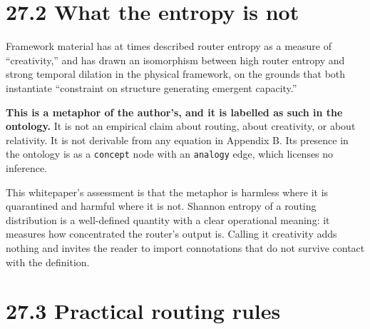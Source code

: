 \documentclass[
  11pt]{report}
\begin{document}
\hypertarget{what-the-entropy-is-not}{%
\section{27.2 What the entropy is not}\label{what-the-entropy-is-not}}

Framework material has at times described router entropy as a measure of
``creativity,'' and has drawn an isomorphism between high router entropy
and strong temporal dilation in the physical framework, on the grounds
that both instantiate ``constraint on structure generating emergent
capacity.''

\textbf{This is a metaphor of the author's, and it is labelled as such
in the ontology.} It is not an empirical claim about routing, about
creativity, or about relativity. It is not derivable from any equation
in Appendix B. Its presence in the ontology is as a \texttt{concept}
node with an \texttt{analogy} edge, which licenses no inference.

This whitepaper's assessment is that the metaphor is harmless where it
is quarantined and harmful where it is not. Shannon entropy of a routing
distribution is a well-defined quantity with a clear operational
meaning: it measures how concentrated the router's output is. Calling it
creativity adds nothing and invites the reader to import connotations
that do not survive contact with the definition.

\hypertarget{practical-routing-rules}{%
\section{27.3 Practical routing rules}\label{practical-routing-rules}}
\end{document}
